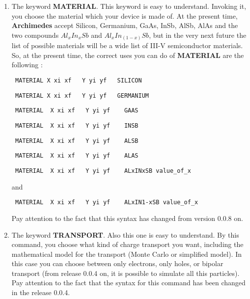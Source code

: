 \documentclass[12pt]{book}
\begin{document}
\begin{enumerate}
\item
The keyword \textbf{MATERIAL}.
This keyword is easy to understand. Invoking it, you choose the material which your device is made of. At the present time, \textbf{Archimedes} accept Silicon, Germanium, GaAs, InSb, AlSb, AlAs and the two compounds $Al_xIn_xSb$ and $Al_xIn_{(1-x)}Sb$, but in the very next future the list of possible materials will be a wide list of III-V semiconductor materials. So, at the present time, the correct uses you can do of \textbf{MATERIAL} are the following :
\begin{verbatim}
 MATERIAL X xi xf   Y yi yf   SILICON
\end{verbatim}

\begin{verbatim}
 MATERIAL X xi xf   Y yi yf   GERMANIUM
\end{verbatim}

\begin{verbatim}
 MATERIAL  X xi xf   Y yi yf    GAAS
\end{verbatim}

\begin{verbatim}
 MATERIAL  X xi xf   Y yi yf    INSB
\end{verbatim}

\begin{verbatim}
 MATERIAL  X xi xf   Y yi yf    ALSB
\end{verbatim}

\begin{verbatim}
 MATERIAL  X xi xf   Y yi yf    ALAS
\end{verbatim}

\begin{verbatim}
 MATERIAL  X xi xf   Y yi yf    ALxINxSB value_of_x
\end{verbatim}
and
\begin{verbatim}
 MATERIAL  X xi xf   Y yi yf    ALxIN1-xSB value_of_x
\end{verbatim}

Pay attention to the fact that this syntax has changed from version 0.0.8 on.

\item 
The keyword \textbf{TRANSPORT}. Also this one is easy to understand. By this command, you choose what kind of charge transport you want, including the mathematical model for the transport (Monte Carlo or simplified model). In this case you can choose between only electrons, only holes, or bipolar transport (from release 0.0.4 on, it is possible to simulate all this particles). Pay attention to the fact that the syntax for this command has been changed in the release 0.0.4.


\end{enumerate}
\end{document}
